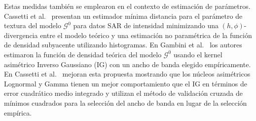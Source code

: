 \documentclass[11pt]{article}
\begin{document}
%
%
%


Estas medidas también se emplearon en el contexto de estimación de parámetros. Cassetti et al.~\cite{APSAR2013ParameterEstimationStochasticDistances} presentan un estimador mínima distancia para el parámetro de textura del modelo $\mathcal{G}^0$ para datos SAR de intensidad minimizando una $(h,\phi)$-divergencia entre el modelo teórico y una estimación no paramétrica de la función de densidad subyacente utilizando histogramas. En Gambini et al.~\cite{gambini2015} los autores estimaron la función de densidad teórica del modelo $\mathcal{G}^0$  usando el kernel asimétrico Inverso Gaussiano (IG) con un ancho de banda elegido empíricamente. En Cassetti et al.~\cite{Cassetti2020} mejoran esta propuesta mostrando que los núcleos asimétricos Lognormal y Gamma tienen un mejor comportamiento que el IG en términos de error cuadrático medio integrado y utilizan el método de validación cruzada de mínimos cuadrados para la selección del ancho de banda en lugar de la selección empírica.
\end{document}
